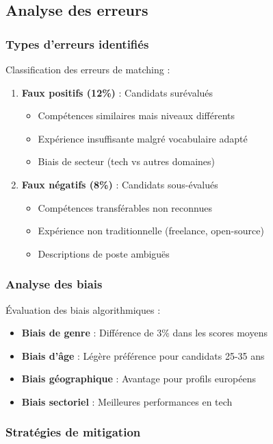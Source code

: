 \documentclass[12pt,a4paper]{report}
\begin{document}
\subsection{Analyse des erreurs}

\subsubsection{Types d'erreurs identifiés}

Classification des erreurs de matching :
\begin{enumerate}
\item \textbf{Faux positifs (12\%)} : Candidats surévalués
   \begin{itemize}
   \item Compétences similaires mais niveaux différents
   \item Expérience insuffisante malgré vocabulaire adapté
   \item Biais de secteur (tech vs autres domaines)
   \end{itemize}

\item \textbf{Faux négatifs (8\%)} : Candidats sous-évalués
   \begin{itemize}
   \item Compétences transférables non reconnues
   \item Expérience non traditionnelle (freelance, open-source)
   \item Descriptions de poste ambiguës
   \end{itemize}
\end{enumerate}

\subsubsection{Analyse des biais}

Évaluation des biais algorithmiques :
\begin{itemize}
\item \textbf{Biais de genre} : Différence de 3\% dans les scores moyens
\item \textbf{Biais d'âge} : Légère préférence pour candidats 25-35 ans
\item \textbf{Biais géographique} : Avantage pour profils européens
\item \textbf{Biais sectoriel} : Meilleures performances en tech
\end{itemize}

\subsubsection{Stratégies de mitigation}
\end{document}
